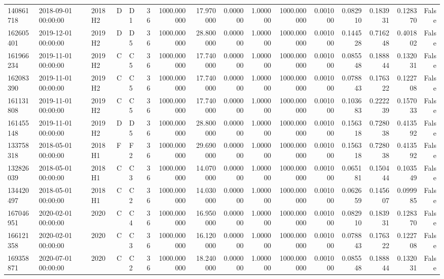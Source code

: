 \begin{tabular}{lllllrrrrrrrrrrr}
140861718 & 2018-09-01 00:00:00 & 2018H2 & D & D1 & 36 & 1000.000000 & 17.970000 & 0.000000 & 1.000000 & 1000.000000 & 0.001000 & 0.082910 & 0.183931 & 0.128370 & False \\
162605401 & 2019-12-01 00:00:00 & 2019H2 & D & D5 & 36 & 1000.000000 & 28.800000 & 0.000000 & 1.000000 & 1000.000000 & 0.001000 & 0.144528 & 0.716248 & 0.401802 & False \\
161966234 & 2019-11-01 00:00:00 & 2019H2 & C & C5 & 36 & 1000.000000 & 17.740000 & 0.000000 & 1.000000 & 1000.000000 & 0.001000 & 0.085548 & 0.188844 & 0.132031 & False \\
162083390 & 2019-11-01 00:00:00 & 2019H2 & C & C5 & 36 & 1000.000000 & 17.740000 & 0.000000 & 1.000000 & 1000.000000 & 0.001000 & 0.078843 & 0.176322 & 0.122708 & False \\
161131808 & 2019-11-01 00:00:00 & 2019H2 & C & C5 & 36 & 1000.000000 & 17.740000 & 0.000000 & 1.000000 & 1000.000000 & 0.001000 & 0.103683 & 0.222239 & 0.157033 & False \\
161455148 & 2019-11-01 00:00:00 & 2019H2 & D & D5 & 36 & 1000.000000 & 28.800000 & 0.000000 & 1.000000 & 1000.000000 & 0.001000 & 0.156318 & 0.728038 & 0.413592 & False \\
133758318 & 2018-05-01 00:00:00 & 2018H1 & F & F2 & 36 & 1000.000000 & 29.690000 & 0.000000 & 1.000000 & 1000.000000 & 0.001000 & 0.156318 & 0.728038 & 0.413592 & False \\
132826039 & 2018-05-01 00:00:00 & 2018H1 & C & C3 & 36 & 1000.000000 & 14.070000 & 0.000000 & 1.000000 & 1000.000000 & 0.001000 & 0.065181 & 0.150444 & 0.103549 & False \\
134420497 & 2018-05-01 00:00:00 & 2018H1 & C & C2 & 36 & 1000.000000 & 14.030000 & 0.000000 & 1.000000 & 1000.000000 & 0.001000 & 0.062659 & 0.145607 & 0.099985 & False \\
167046951 & 2020-02-01 00:00:00 & 2020 & C & C4 & 36 & 1000.000000 & 16.950000 & 0.000000 & 1.000000 & 1000.000000 & 0.001000 & 0.082910 & 0.183931 & 0.128370 & False \\
166121358 & 2020-02-01 00:00:00 & 2020 & C & C3 & 36 & 1000.000000 & 16.120000 & 0.000000 & 1.000000 & 1000.000000 & 0.001000 & 0.078843 & 0.176322 & 0.122708 & False \\
169358871 & 2020-07-01 00:00:00 & 2020 & C & C2 & 36 & 1000.000000 & 18.240000 & 0.000000 & 1.000000 & 1000.000000 & 0.001000 & 0.085548 & 0.188844 & 0.132031 & False \\
\bottomrule
\end{tabular}
